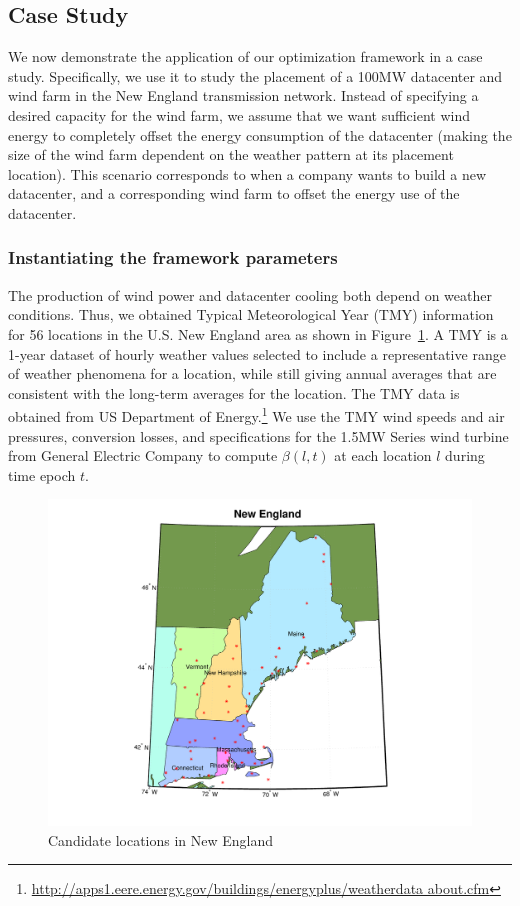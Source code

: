 \subsection{Case Study}
\label{sec:eval}

We now demonstrate the application of our optimization framework in a case study.  Specifically, we use it to study the placement of a 100MW datacenter and wind farm in the New England transmission network.  Instead of specifying a desired capacity for the wind farm, we assume that we want sufficient wind energy to completely offset the energy consumption of the datacenter (making the size of the wind farm dependent on the weather pattern at its placement location).  This scenario corresponds to when a company wants to build a new datacenter, and a corresponding wind farm to offset the energy use of the datacenter.

\subsubsection{Instantiating the framework parameters}

The production of wind power and datacenter cooling both depend on weather conditions.  Thus, we obtained Typical Meteorological Year (TMY) information for 56 locations in the U.S. New England area as shown in Figure~\ref{fig:NE_locs}.  A TMY is a 1-year dataset of hourly weather values selected to include a representative range of weather phenomena for a location, while still giving annual averages that are consistent with the long-term averages for the location.  The TMY data is obtained from US Department of Energy.\footnote{\url{http://apps1.eere.energy.gov/buildings/energyplus/weatherdata about.cfm}} We use the TMY wind speeds and air pressures, conversion losses, and specifications for the 1.5MW Series wind turbine from General Electric Company \cite{GE15MW} to compute $\beta(l,t)$ at each location $l$ during time epoch $t$.

\begin{figure}[ht]
\centering
\includegraphics[width=1\columnwidth]{img/NE_map}
\caption{Candidate locations in New England}
\label{fig:NE_locs}
\end{figure}

